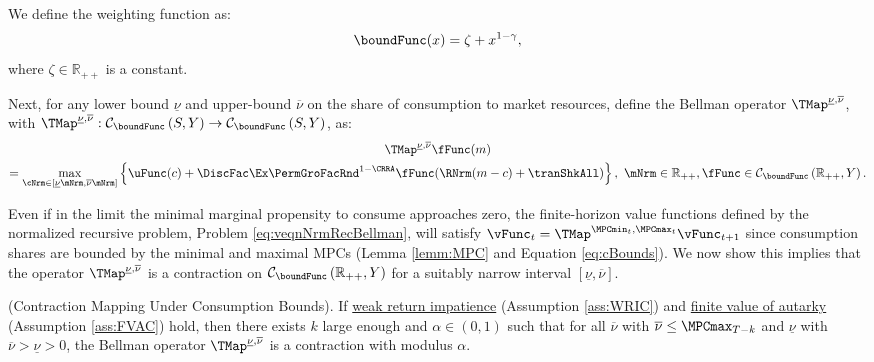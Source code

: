 \documentclass[BufferStockTheory]{subfiles}
\begin{document}
We define the weighting function as:
%
\begin{equation}
\boundFunc(x) = \zeta + x^{1-\gamma},
\end{equation}
where $\zeta \in \mathbb{R}_{++}$ is a constant.

\newcommand{\MPCminInf}{\underline{\nu}}
\newcommand{\MPCmaxInf}{\overline{\nu}}
  
Next, for any lower bound $\MPCminInf$ and upper-bound $\MPCmaxInf$ on the share of consumption to market resources, define the Bellman operator $\TMap^{\MPCminInf, \MPCmaxInf}$, with \textit{$\TMap^{\MPCminInf, \MPCmaxInf}:\mathcal{C}_{\boundFunc }\left( S,Y\right) \rightarrow \mathcal{C}_{\boundFunc }\left( S,Y\right) $}, as:
%
%
\begin{multline}
\TMap^{\MPCminInf, \MPCmaxInf} \fFunc(m) \\  = \max_{\cNrm \in
    [\MPCminInf \mNrm, \MPCmaxInf \mNrm]
  }  \left\{\uFunc(c) + \DiscFac\Ex\PermGroFacRnd^{1-\CRRA}\fFunc(\RNrm(m - c) + \tranShkAll)\right\}, \,\,  \mNrm\in \mathbb{R}_{++}, \fFunc\in \mathcal{C}_{\boundFunc }\left(\mathbb{R}_{++},Y\right).
\end{multline}

Even if in the limit the minimal marginal propensity to consume approaches zero, the finite-horizon value functions defined by the normalized recursive problem, Problem \eqref{eq:veqnNrmRecBellman}, will satisfy  $\vFunc_{t} = \TMap^{\MPCmin_{t}, \MPCmax_{t}}\vFunc_{t+1}$ since consumption shares are bounded by the minimal and maximal MPCs (Lemma \ref{lemm:MPC} and Equation \eqref{eq:cBounds}). We now show this implies that the operator $\TMap^{\MPCminInf, \MPCmaxInf}$ is a contraction on $\mathcal{C}_{\boundFunc }\left( \mathbb{R}_{++},Y\right)$ for a suitably narrow interval $[\MPCminInf, \MPCmaxInf]$.  

\begin{theorem}(Contraction Mapping Under Consumption Bounds). \label{thm:cmap}
If \hyperlink{WRIC}{weak return impatience} (Assumption \ref{ass:WRIC})  and  \hyperlink{FVAC}{finite value of autarky} (Assumption \ref{ass:FVAC}) hold, then there exists $k$ large enough and $\alpha\in (0,1)$ such that for all $\MPCmaxInf$ with $\MPCmaxInf\leq \MPCmax_{T-k}$ and $\MPCminInf$ with $\MPCmaxInf> \MPCminInf>0$, the Bellman operator $\TMap^{\MPCminInf, \MPCmaxInf}$ is a contraction with modulus $\alpha$.
\end{theorem}
\end{document}
